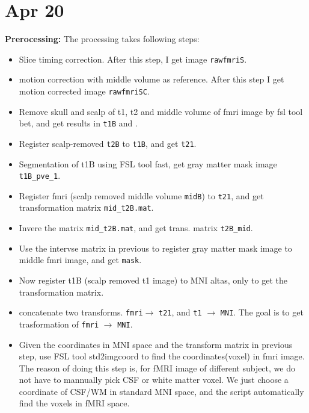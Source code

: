 \documentclass[12pt]{article}
\begin{document}
\section{Apr 20}
\textbf{Prerocessing: } The processing takes following steps:
\begin{itemize}

\item Slice timing correction. After this step, I get image
  \texttt{rawfmriS}.
  \item motion correction with middle volume as reference. After this
    step I get motion corrected image \texttt{rawfmriSC}. 
  \item Remove skull and scalp of t1, t2 and middle volume of fmri
    image by fsl tool \textsf{bet}, and get results in \texttt{t1B}
    and .
  \item Register scalp-removed \texttt{t2B} to \texttt{t1B}, and get
    \texttt{t21}. 
  \item Segmentation of t1B using FSL tool
    \textsf{fast}, get gray matter mask image \texttt{t1B\_pve\_1}.

  \item Register fmri (scalp removed middle volume \texttt{midB}) to \texttt{t21},
    and get transformation matrix \texttt{mid\_t2B.mat}.

  \item Invere the matrix \texttt{mid\_t2B.mat}, and get trans. matrix
    \texttt{t2B\_mid}.
  \item  Use the intervse matrix in previous to register gray matter mask image to middle fmri image, and get \texttt{mask}.
  \item Now register t1B (scalp removed t1 image) to MNI altas, only to get the transformation matrix.
  \item concatenate two transforms. \texttt{fmri}$\rightarrow$ \texttt{t21}, and \texttt{t1} $\rightarrow$ \texttt{MNI}. The goal is to get trasformation of \texttt{fmri} $\rightarrow$ \texttt{MNI}.

\item Given the coordinates in MNI space and the transform matrix in previous step, use FSL tool \textsf{std2imgcoord} to find the coordinates(voxel) in fmri image. The reason of doing this step is, for fMRI image of different subject, we do not have to mannually pick CSF or white matter voxel. We just choose a coordinate of CSF/WM in standard MNI space, and the script automatically find the voxels in fMRI space. 
\end{itemize}
\end{document}
